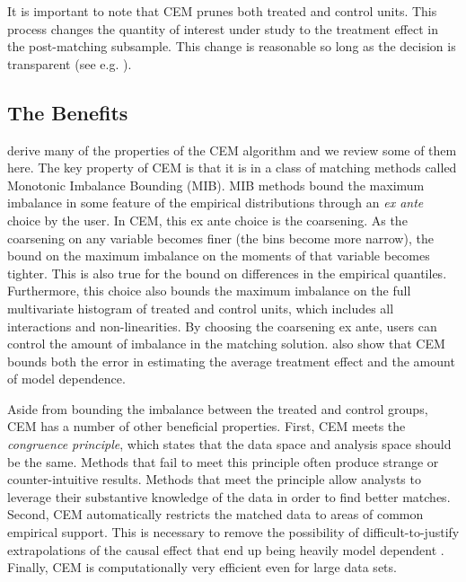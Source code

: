 \documentclass[11pt,titlepage]{article}
\begin{document}
It is important to note that CEM prunes both treated and control
units.  This process changes the quantity of interest under study to
the treatment effect in the post-matching subsample. This change is
reasonable so long as the decision is transparent (see e.g.
\citet{CruHotImb06}).

\subsection{The Benefits}
\citet{IacKinPor12} derive many of the properties of the CEM algorithm and
we review some of them here. The key property of CEM is that it is in a
class of matching methods called Monotonic Imbalance Bounding (MIB). MIB
methods bound the maximum imbalance in some feature of the empirical
distributions through an \emph{ex ante} choice by the user. In CEM, this
ex ante choice is the coarsening. As the coarsening on any variable
becomes finer (the bins become more narrow), the bound on the maximum
imbalance on the moments of that variable becomes tighter. This is also
true for the bound on differences in the empirical quantiles.
Furthermore, this choice also bounds the maximum imbalance on the full
multivariate histogram of treated and control units, which includes all
interactions and non-linearities. By choosing the coarsening ex ante,
users can control the amount of imbalance in the matching solution.
\citet{IacKinPor12} also show that CEM bounds both the error in estimating the
average treatment effect and the amount of model dependence.

Aside from bounding the imbalance between the treated and control groups,
CEM has a number of other beneficial properties. First, CEM meets the
\emph{congruence principle}, which states that the data space and analysis
space should be the same. Methods that fail to meet this principle often
produce strange or counter-intuitive results. Methods that meet the
principle allow analysts to leverage their substantive knowledge of the
data in order to find better matches. Second, CEM automatically restricts
the matched data to areas of common empirical support. This is necessary to
remove the possibility of difficult-to-justify extrapolations of the
causal effect that end up being heavily model dependent
\citep{KinZen06}. Finally, CEM is computationally very efficient even
for large data sets.
\end{document}

